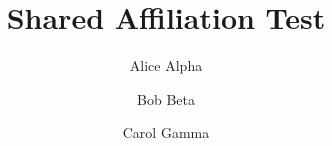 \documentclass{llncs}
\begin{document}
\title{Shared Affiliation Test}
\author{Alice Alpha \and Bob Beta \and Carol Gamma}
\maketitle
\end{document}
